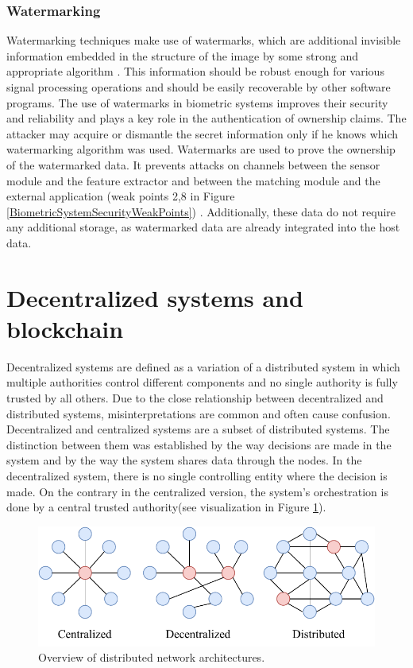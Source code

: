 \subsubsection{Watermarking}
Watermarking techniques make use of watermarks, which are additional invisible information embedded in the structure of the image by some strong and appropriate algorithm \cite{SecurityOnFingerprint}. This information should be robust enough for various signal processing operations and should be easily recoverable by other software programs. The use of watermarks in biometric systems improves their security and reliability and plays a key role in the authentication of ownership claims. The attacker may acquire or dismantle the secret information only if he knows which watermarking algorithm was used. Watermarks are used to prove the ownership of the watermarked data. It prevents attacks on channels between the sensor module and the feature extractor and between the matching module and the external application (weak points 2,8 in Figure \ref{BiometricSystemSecurityWeakPoints}) \cite{AttacksOnBiometrics}.  Additionally, these data do not require any additional storage, as watermarked data are already integrated into the host data.



\section{Decentralized systems and blockchain}
\label{Decentralized systems and blockchain}
Decentralized systems are defined as a variation of a distributed system in which multiple authorities control different components and no single authority is fully trusted by all others\cite{SystematizingDecentralization}.
Due to the close relationship between decentralized and distributed systems, misinterpretations are common and often cause confusion. Decentralized and centralized systems are a subset of distributed systems. The distinction between them was established by the way decisions are made in the system and by the way the system shares data through the nodes. In the decentralized system, there is no single controlling entity where the decision is made. On the contrary in the centralized version, the system's orchestration is done by a central trusted authority(see visualization in Figure \ref{DistributedSystemsComparison}).

\begin{figure}[h]
	\centering
	\includegraphics[width=0.8\linewidth]{obrazky-figures/DistributedSystemsComparison.pdf}
	\caption{Overview of distributed network architectures.}
	\label{DistributedSystemsComparison}
\end{figure}


